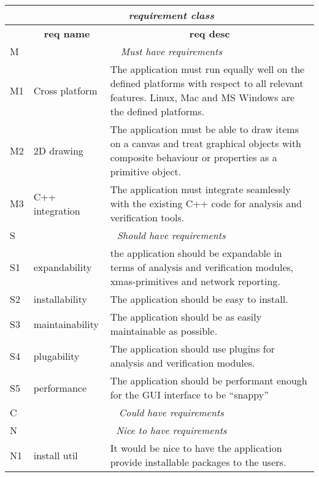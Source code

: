 \begin{center}
    \small\sf
    \begin{tabular}{|l|p{7em}|p{23em}|}
	\hline
	        & \multicolumn{2}{c|}{\sf\em\large requirement class}\\\hline
	{}      & \multicolumn{1}{c|}{\bf req name} & \multicolumn{1}{c|}{\bf req desc}\\\hline
	M	& \multicolumn{2}{c|}{\sf\emph{\large Must have requirements}}
		\\\hline
	M1	& Cross platform & The application must run equally well on the
				    defined platforms with respect to all relevant features.
				    Linux, Mac and MS Windows are the defined platforms.
		\\\hline
	M2	& 2D drawing & The application must be able to draw items on a
				canvas and treat graphical objects with composite
				behaviour or properties as a primitive object.
		\\\hline
	M3	& C++ integration & The application must integrate seamlessly with
				the existing C++ code for analysis and verification tools.
		\\\hline
	S	& \multicolumn{2}{c|}{\sf\emph{\large Should have requirements}}
		\\\hline
	S1	& expandability & the application should be expandable in terms of
				analysis and verification modules, xmas-primitives and
				network reporting.
		\\\hline
	S2	& installability & The application should be easy to install.
		\\\hline
	S3	& maintainability & The application should be as easily maintainable as possible.
		\\\hline
	S4	& plugability	& The application should use plugins for analysis and
				verification modules.
		\\\hline
	S5	& performance	& The application should be performant enough for the GUI
				    interface to be ``snappy''
		\\\hline
	C	& \multicolumn{2}{c|}{\sf\emph{\large Could have requirements}}
		\\\hline
	N	& \multicolumn{2}{c|}{\sf\emph{\large Nice to have requirements}}
		\\\hline
	N1	& install util	& It would be nice to have the application provide
				installable packages to the users.
		\\\hline
    \end{tabular}
    \label{tab: appl-requirements}
\end{center}

